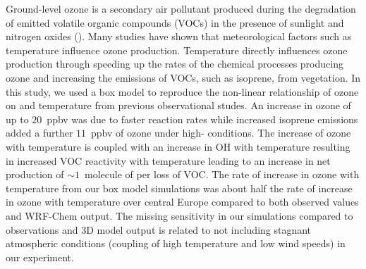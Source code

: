 Ground-level ozone is a secondary air pollutant produced during the degradation of emitted volatile organic compounds (VOCs) in the presence of sunlight and nitrogen oxides (). 
Many studies have shown that meteorological factors such as temperature influence ozone production.
Temperature directly influences ozone production through speeding up the rates of the chemical processes producing ozone and increasing the emissions of VOCs, such as isoprene, from vegetation.
In this study, we used a box model to reproduce the non-linear relationship of ozone on  and temperature from previous observational studes.
An increase in ozone of up to $20$~ppbv was due to faster reaction rates while increased isoprene emissions added a further $11$~ppbv of ozone under high- conditions.
The increase of ozone with temperature is coupled with an increase in OH with temperature resulting in increased VOC reactivity with temperature leading to an increase in net  production of $\sim1$~molecule of  per loss of VOC.
The rate of increase in ozone with temperature from our box model simulations was about half the rate of increase in ozone with temperature over central Europe compared to both observed values and WRF-Chem output.
The missing sensitivity in our simulations compared to observations and 3D model output is related to not including stagnant atmospheric conditions (coupling of high temperature and low wind speeds) in our experiment.
